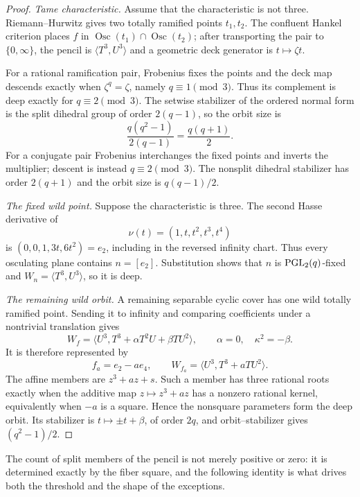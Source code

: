 \begin{proof}
\emph{Tame characteristic.}
Assume that the characteristic is not three.  Riemann--Hurwitz
gives two totally ramified points $t_1,t_2$.  The confluent Hankel
criterion places $f$ in
$\operatorname{Osc}(t_1)\cap\operatorname{Osc}(t_2)$; after transporting
the pair to $\{0,\infty\}$, the pencil is
$\langle T^3,U^3\rangle$ and a geometric deck generator is
$t\mapsto\zeta t$.

For a rational ramification pair, Frobenius fixes the points and the
deck map descends exactly when $\zeta^q=\zeta$, namely
$q\equiv1\pmod3$.  Thus its complement is deep exactly for
$q\equiv2\pmod3$.  The setwise stabilizer of the ordered normal form is
the split dihedral group of order $2(q-1)$, so the orbit size is
\[
       \frac{q(q^2-1)}{2(q-1)}=\frac{q(q+1)}2.
\]
For a conjugate pair Frobenius interchanges the fixed points and
inverts the multiplier; descent is instead $q\equiv2\pmod3$.  The
nonsplit dihedral stabilizer has order $2(q+1)$ and the orbit size is
$q(q-1)/2$.

\emph{The fixed wild point.}
Suppose the characteristic is three.  The second Hasse derivative
of
\[
       \nu(t)=(1,t,t^2,t^3,t^4)
\]
is $(0,0,1,3t,6t^2)=e_2$, including in the reversed infinity chart.
Thus every osculating plane contains $n=[e_2]$.  Substitution shows that
$n$ is $\operatorname{PGL}_2(q)$-fixed and
$W_n=\langle T^3,U^3\rangle$, so it is deep.

\emph{The remaining wild orbit.}
A remaining separable cyclic cover has one wild totally ramified
point.  Sending it to infinity and comparing coefficients under a
nontrivial translation gives
\[
 W_f=\langle U^3,T^3+\alpha T^2U+\beta TU^2\rangle,\qquad
 \alpha=0,\quad \kappa^2=-\beta.
\]
It is therefore represented by
\[
 f_a=e_2-ae_4,\qquad
 W_{f_a}=\langle U^3,T^3+aTU^2\rangle.
\]
The affine members are $z^3+az+s$.  Such a member has three rational
roots exactly when the additive map $z\mapsto z^3+az$ has a nonzero
rational kernel, equivalently when $-a$ is a square.  Hence the
nonsquare parameters form the deep orbit.  Its stabilizer is
$t\mapsto\pm t+\beta$, of order $2q$, and orbit--stabilizer gives
$(q^2-1)/2$.
\end{proof}

The count of split members of the pencil is not merely positive or
zero: it is determined exactly by the fiber square, and the following
identity is what drives both the threshold and the shape of the
exceptions.

